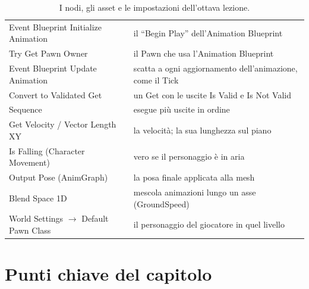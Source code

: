 \begin{table}[htbp]
\begin{tabular}{@{}p{4.6cm}p{9.4cm}@{}}
Event Blueprint Initialize Animation & il ``Begin Play'' dell'Animation Blueprint \\
Try Get Pawn Owner & il Pawn che usa l'Animation Blueprint \\
Event Blueprint Update Animation & scatta a ogni aggiornamento dell'animazione, come il
Tick \\
Convert to Validated Get & un Get con le uscite Is Valid e Is Not Valid \\
Sequence & esegue più uscite in ordine \\
Get Velocity / Vector Length XY & la velocità; la sua lunghezza sul piano \\
Is Falling (Character Movement) & vero se il personaggio è in aria \\
Output Pose (AnimGraph) & la posa finale applicata alla mesh \\
Blend Space 1D & mescola animazioni lungo un asse (GroundSpeed) \\
World Settings $\rightarrow$ Default Pawn Class & il personaggio del giocatore in quel
livello \\
\bottomrule
\end{tabular}
\caption{I nodi, gli asset e le impostazioni dell'ottava lezione.}
\label{ue8:tab:nodi}
\end{table}

\section*{Punti chiave del capitolo}

